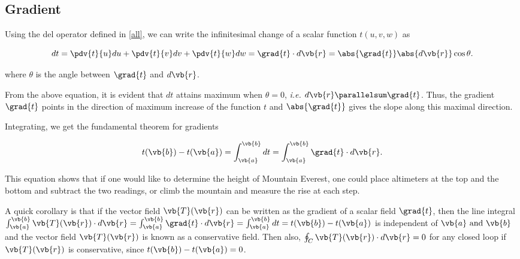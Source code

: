 \documentclass[english,a4paper,12pt]{report}
\begin{document}
\subsection{Gradient}
Using the del operator defined in \cref{all}, we can write the infinitesimal change of a scalar function \(t(u,v,w)\) as

\begin{equation}
    dt = \pdv{t}{u}du + \pdv{t}{v}dv + \pdv{t}{w}dw = \grad{t} \cdot d\vb{r}  = \abs{\grad{t} }\abs{d \vb{r} }\cos \theta   . \label{dt} 
\end{equation}

where \(\theta\) is the angle between \(\grad{t}\) and \(d\vb{r}\).
	
From the above equation, it is evident that \(dt\) attains maximum when \(\theta = 0\), \textit{i.e.} \(d\vb{r} \parallelsum \grad{t}\). Thus, the gradient \(\grad{t}\) points in the direction of maximum increase of the function \(t\) and \(\abs{\grad{t}}\) gives the slope along this maximal direction.


	
Integrating, we get the fundamental theorem for gradients

\begin{equation} 
	t(\vb{b}) - t(\vb{a}) = \int_{\vb{a} }^{\vb{b} } dt = \int_{\vb{a}}^{\vb{b}} \grad{t} \cdot d\vb{r}. 
\end{equation}
	
This equation shows that if one would like to determine the height of Mountain Everest, one could place altimeters at the top and the bottom and subtract the two readings, or climb the mountain and measure the rise at each step.

A quick corollary is that if the vector field \(\vb{T} (\vb{r} )\) can be written as the gradient of a scalar field \(\grad{t}  \), then the line integral \(\int_{\vb{a} }^{\vb{b} } \vb{T}(\vb{r} ) \cdot  d\vb{r}  = \int_{\vb{a} }^{\vb{b} } \grad{t} \cdot d\vb{r} = \int_{\vb{a} }^{\vb{b} }dt = t(\vb{b} ) - t(\vb{a} )\) is independent of \(\vb{a} \text { and } \vb{b} \) and the vector field \(\vb{T} (\vb{r} )\) is known as a conservative field. Then also, \(\oint_{C} \vb{T} (\vb{r} ) \cdot d\vb{r} = 0\) for any closed loop if \(\vb{T} (\vb{r} )\) is conservative, since \(t(\vb{b}) - t(\vb{a}) = 0\). 
\end{document}
